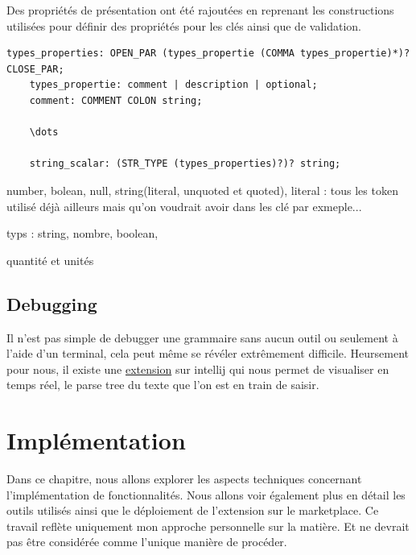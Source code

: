\documentclass[
    iict, %
    il, %
]{heig-tb}
\begin{document}
Des propriétés de présentation ont été rajoutées en reprenant les constructions utilisées pour définir des propriétés pour les clés ainsi que de validation.

\begin{lstlisting}[frame=single,caption={types properties},label={types_properties}]
    types_properties: OPEN_PAR (types_propertie (COMMA types_propertie)*)? CLOSE_PAR;
    types_propertie: comment | description | optional;
    comment: COMMENT COLON string;

    \dots

    string_scalar: (STR_TYPE (types_properties)?)? string;
\end{lstlisting}

number, bolean, null, string(literal, unquoted et quoted),
literal : tous les token utilisé déjà ailleurs mais qu'on voudrait avoir dans les clé par exmeple...

typs : string, nombre, boolean,

quantité et unités



\section{Debugging}

Il n'est pas simple de debugger une grammaire sans aucun outil ou seulement à l'aide d'un terminal, cela peut même se révéler extrêmement difficile.
Heursement pour nous, il existe une \href{https://plugins.jetbrains.com/plugin/7358-antlr-v4}{extension} sur intellij qui nous permet de visualiser en temps réel, le parse tree du texte que l'on est en train de saisir.




\chapter{Implémentation}
Dans ce chapitre, nous allons explorer les aspects techniques concernant l'implémentation de fonctionnalités. Nous allons voir également plus en détail les outils utilisés ainsi que le déploiement de l'extension sur le marketplace.
Ce travail reflète uniquement mon approche personnelle sur la matière. Et ne devrait pas être considérée comme l'unique manière de procéder.

\end{document}
